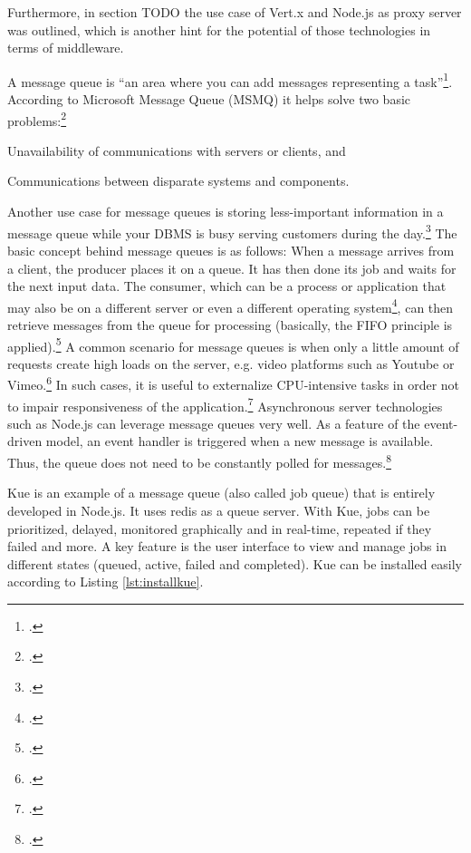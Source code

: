 \begin{appendices}
\begin{subappendices}
Furthermore, in section TODO the use case of Vert.x and Node.js as proxy server was outlined, which is another hint for the potential of those technologies in terms of middleware.


\label{appendix_kue}

A message queue is “an area where you can add messages representing a task”\footcite[][2]{McGlennon_2007}. According to Microsoft Message Queue (MSMQ) it helps solve two basic problems:\footcite[Cf.][1]{McGlennon_2007}
\begin{description}
  \item Unavailability of communications with servers or clients, and 
  \item Communications between disparate systems and components.
\end{description}
Another use case for message queues is storing less-important information in a message queue while your DBMS is busy serving customers during the day.\footcite[Cf.][449]{Thomson_2002}
The basic concept behind message queues is as follows: When a message arrives from a client, the producer places it on a queue. It has then done its job and waits for the next input data. The consumer, which can be a process or application that may also be on a different server or even a different operating system\footcite[Cf.][2]{McGlennon_2007}, can then retrieve messages from the queue for processing (basically, the FIFO principle is applied).\footcite[Cf.][450]{Thomson_2002}
A common scenario for message queues is when only a little amount of requests create high loads on the server, e.g. video platforms such as Youtube or Vimeo.\footcite[Cf.][247]{Roden_2012} In such cases, it is useful to externalize CPU-intensive tasks in order not to impair responsiveness of the application.\footcite[Cf.][247]{Roden_2012}
Asynchronous server technologies such as Node.js can leverage message queues very well. As a feature of the event-driven model, an event handler is triggered when a new message is available. Thus, the queue does not need to be constantly polled for messages.\footcite[Cf.][]{Knight_2011}

Kue is an example of a message queue (also called job queue) that is entirely developed in Node.js. It uses redis as a queue server. With Kue, jobs can be prioritized, delayed, monitored graphically and in real-time, repeated if they failed and more. A key feature is the user interface to view and manage jobs in different states (queued, active, failed and completed). Kue can be installed easily according to Listing \ref{lst:installkue}.


\end{subappendices}
\end{appendices}
